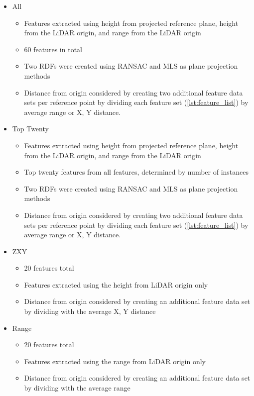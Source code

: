 \documentclass[numbered,pdftex]{ohio-etd}
\begin{document}
{{{{				\begin{itemize}[itemsep=1pt]
					\item All 
					\begin{itemize}[itemsep=1pt]
						\item Features extracted using height from projected reference plane, height from the LiDAR origin, and range from the LiDAR origin
						\item 60 features in total
						\item Two RDFs were created using RANSAC and MLS as plane projection methods
						\item Distance from origin considered by creating two additional feature data sets per reference point by dividing each feature set (\ref{lst:feature_list}) by average range or X, Y distance. 
					\end{itemize}
					\item Top Twenty 
					\begin{itemize}[itemsep=1pt]
						\item Features extracted using height from projected reference plane, height from the LiDAR origin, and range from the LiDAR origin
						\item Top twenty features from all features, determined by number of instances
						\item Two RDFs were created using RANSAC and MLS as plane projection methods
						\item Distance from origin considered by creating two additional feature data sets per reference point by dividing each feature set (\ref{lst:feature_list}) by average range or X, Y distance.
					\end{itemize}
					\item ZXY
					\begin{itemize}[itemsep=1pt]
						\item 20 features total
						\item Features extracted using the height from LiDAR origin only
						\item Distance from origin considered by creating an additional feature data set by dividing with the average X, Y distance
					\end{itemize}
					\item Range
					\begin{itemize}[itemsep=1pt]
						\item 20 features total
						\item Features extracted using the range from LiDAR origin only
						\item Distance from origin considered by creating an additional feature data set by dividing with the average range
					\end{itemize}
				\end{itemize}
		
}}}}
\end{document}
